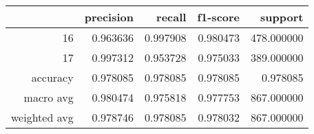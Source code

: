 \begin{table}[h]
\centering
\label{table:5}
\begin{tabular}{rrrrr}
\toprule
 & precision & recall & f1-score & support \\
\midrule
16 & 0.963636 & 0.997908 & 0.980473 & 478.000000 \\
17 & 0.997312 & 0.953728 & 0.975033 & 389.000000 \\
accuracy & 0.978085 & 0.978085 & 0.978085 & 0.978085 \\
macro avg & 0.980474 & 0.975818 & 0.977753 & 867.000000 \\
weighted avg & 0.978746 & 0.978085 & 0.978032 & 867.000000 \\
\bottomrule
\end{tabular}
\end{table}
